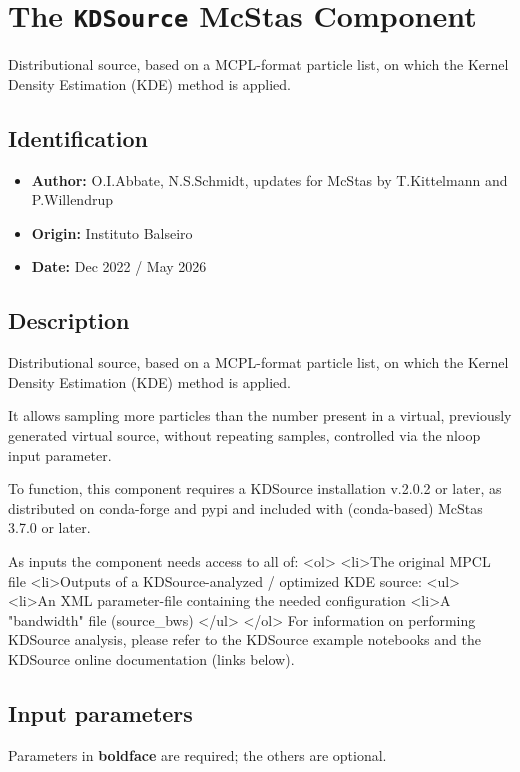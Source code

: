 \section{The \texttt{KDSource} McStas Component}
Distributional source, based on a MCPL-format particle list, on which
the Kernel Density Estimation (KDE) method is applied.

\subsection*{Identification}
\begin{itemize}
  \item \textbf{Author:} O.I.Abbate, N.S.Schmidt, updates for McStas by T.Kittelmann and P.Willendrup
  \item \textbf{Origin:} Instituto Balseiro
  \item \textbf{Date:} Dec 2022 / May 2026
\end{itemize}

\subsection*{Description}
Distributional source, based on a MCPL-format particle list, on which the Kernel Density Estimation (KDE) method is applied.

It allows sampling more particles than the number present in a virtual, previously generated virtual source, without repeating samples, controlled via the nloop input parameter.

To function, this component requires a KDSource installation v.2.0.2 or later, as distributed on conda-forge and pypi and included with (conda-based) McStas 3.7.0 or later.

As inputs the component needs access to all of: \textless{}ol\textgreater{} \textless{}li\textgreater{}The original MPCL file \textless{}li\textgreater{}Outputs of a KDSource-analyzed / optimized KDE source: \textless{}ul\textgreater{} \textless{}li\textgreater{}An XML parameter-file containing the needed configuration \textless{}li\textgreater{}A "bandwidth" file (source\_bws) \textless{}/ul\textgreater{} \textless{}/ol\textgreater{} For information on performing KDSource analysis, please refer to the KDSource example notebooks and the KDSource online documentation (links below).

\subsection*{Input parameters}
Parameters in \textbf{boldface} are required; the others are optional.

